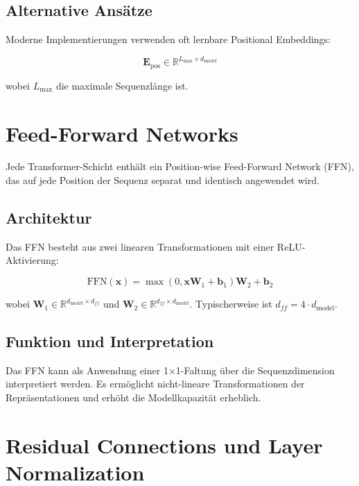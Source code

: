 \subsection{Alternative Ansätze}

Moderne Implementierungen verwenden oft lernbare Positional Embeddings:

\begin{equation}
\mathbf{E}_{\text{pos}} \in \mathbb{R}^{L_{\max} \times d_{\text{model}}}
\end{equation}

wobei $L_{\max}$ die maximale Sequenzlänge ist.

\section{Feed-Forward Networks}

Jede Transformer-Schicht enthält ein Position-wise Feed-Forward Network (FFN), das auf jede Position der Sequenz separat und identisch angewendet wird.

\subsection{Architektur}

Das FFN besteht aus zwei linearen Transformationen mit einer ReLU-Aktivierung:

\begin{equation}
\text{FFN}(\mathbf{x}) = \max(0, \mathbf{x}\mathbf{W}_1 + \mathbf{b}_1)\mathbf{W}_2 + \mathbf{b}_2
\end{equation}

wobei $\mathbf{W}_1 \in \mathbb{R}^{d_{\text{model}} \times d_{ff}}$ und $\mathbf{W}_2 \in \mathbb{R}^{d_{ff} \times d_{\text{model}}}$. Typischerweise ist $d_{ff} = 4 \cdot d_{\text{model}}$.

\subsection{Funktion und Interpretation}

Das FFN kann als Anwendung einer 1×1-Faltung über die Sequenzdimension interpretiert werden. Es ermöglicht nicht-lineare Transformationen der Repräsentationen und erhöht die Modellkapazität erheblich.

\section{Residual Connections und Layer Normalization}

